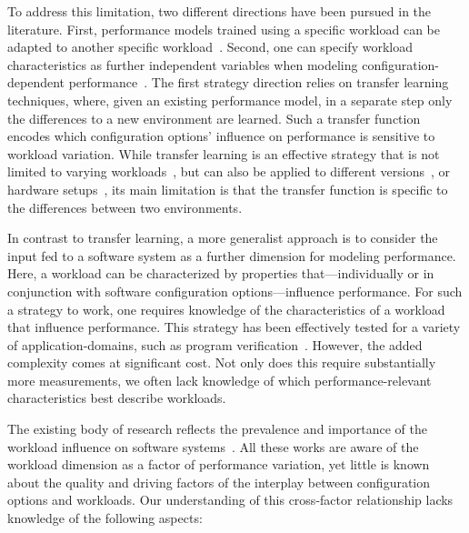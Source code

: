 To address this limitation, two different directions have been pursued in the literature. First, performance models trained using a specific workload can be adapted to another specific workload~\cite{jamishidi_transfer_2017,jamshidi_learning_2018,jamshidi_transfer_gp_2017}. Second,  one can specify workload characteristics as further independent variables when modeling configuration-dependent performance~\cite{koc_satune_2021}.
The first strategy direction relies on transfer learning techniques, where, given an existing performance model, in a separate step only the differences to a new environment are learned. Such a transfer function encodes which configuration options’ influence on performance is sensitive to workload variation. While transfer learning is an effective strategy that is not limited to varying workloads~\cite{jamshidi_learning_2018}, but can also be applied to different versions~\cite{jamishidi_transfer_2017,jamshidi_transfer_gp_2017,martin_transfer_2021}, or hardware setups~\cite{ding_bayesian_2020}, its main limitation is that the transfer function is specific to the differences between two environments.

In contrast to transfer learning, a more generalist approach is to consider the input fed to a software system as a further dimension for modeling performance. Here, a workload can be characterized by properties that---individually or in conjunction with software configuration options---influence performance. For such a strategy to work, one requires knowledge of the characteristics of a workload that influence performance. This strategy has been effectively tested for a  variety of application-domains, such as program verification~\cite{koc_satune_2021}. However, the added complexity comes at significant cost. 
Not only does this require substantially more measurements, we often lack knowledge of which performance-relevant characteristics best describe workloads.
 
The existing body of research reflects the prevalence and importance of the workload influence on software systems~\cite{khavari_compression_2019,maxiaguine_workload_2004,plotnikov_compilation_2013,ding_compilation_2015,falkner_sat_solvers_2015,satzilla_2008,alves_sampling_2020}. All these works are aware of the workload dimension as a factor of performance variation, yet little is known about the quality and driving factors of the interplay between configuration options and workloads. Our understanding of this cross-factor relationship lacks knowledge of the following aspects:

